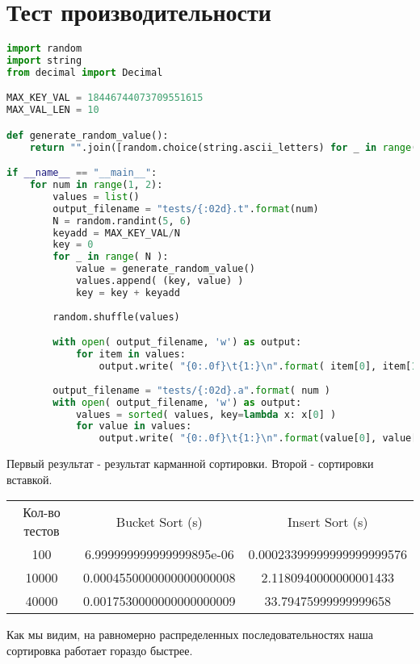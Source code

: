 \section{Тест производительности}
\begin{lstlisting}[language=Python]
import random
import string
from decimal import Decimal

MAX_KEY_VAL = 18446744073709551615
MAX_VAL_LEN = 10

def generate_random_value():
    return "".join([random.choice(string.ascii_letters) for _ in range(1, MAX_VAL_LEN)])

if __name__ == "__main__":
    for num in range(1, 2):
        values = list()
        output_filename = "tests/{:02d}.t".format(num)
        N = random.randint(5, 6)
        keyadd = MAX_KEY_VAL/N
        key = 0
        for _ in range( N ):
            value = generate_random_value()
            values.append( (key, value) )
            key = key + keyadd
	
        random.shuffle(values)

        with open( output_filename, 'w') as output:
            for item in values:
                output.write( "{0:.0f}\t{1:}\n".format( item[0], item[1] ) )
        
        output_filename = "tests/{:02d}.a".format( num )
        with open( output_filename, 'w') as output:
            values = sorted( values, key=lambda x: x[0] )
            for value in values:
                output.write( "{0:.0f}\t{1:}\n".format(value[0], value[1]) )   
\end{lstlisting}
Первый результат - результат карманной сортировки. Второй - сортировки вставкой.

\begin{center}
\begin{table}[h]

\label{tabular:timesandtenses}

\begin{tabular}{c|c|c}
Кол-во тестов & Bucket Sort (s) & Insert Sort (s)\\

100 & 6.999999999999999895e-06
 & 0.00023399999999999999576\\
10000 & 0.0004550000000000000008 & 2.1180940000000001433\\
40000 & 0.0017530000000000000009 & 33.79475999999999658\\
\end{tabular}
\end{table}
\end{center}
Как мы видим, на равномерно распределенных последовательностях наша сортировка работает гораздо быстрее.


 
\pagebreak
